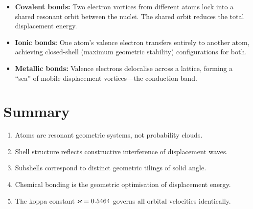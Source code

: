 \begin{itemize}
  \item \textbf{Covalent bonds:} Two electron vortices from different atoms lock into a shared resonant orbit between the nuclei. The shared orbit reduces the total displacement energy.
  \item \textbf{Ionic bonds:} One atom's valence electron transfers entirely to another atom, achieving closed-shell (maximum geometric stability) configurations for both.
  \item \textbf{Metallic bonds:} Valence electrons delocalise across a lattice, forming a ``sea'' of mobile displacement vortices---the conduction band.
\end{itemize}


\section{Summary}

\begin{enumerate}
  \item Atoms are resonant geometric systems, not probability clouds.
  \item Shell structure reflects constructive interference of displacement waves.
  \item Subshells correspond to distinct geometric tilings of solid angle.
  \item Chemical bonding is the geometric optimisation of displacement energy.
  \item The koppa constant $\varkappa = 0.5464$ governs all orbital velocities identically.
\end{enumerate}
